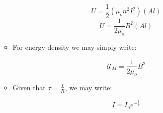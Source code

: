 \begin{itemize}
\begin{itemize}
        $$U=\frac{1}{2}(\mu_on^2I^2)(Al)$$
        $$U=\frac{1}{2\mu_o}B^2(Al)$$

      \item For energy density we may simply write:

        $$\mathcal{U}_M=\frac{1}{2\mu_o}B^2$$

      \item Given that $\tau=\frac{L}{R}$, we may write:

        $$I=I_oe^{-\frac{t}{\tau}}$$

    \end{itemize}

\end{itemize}



